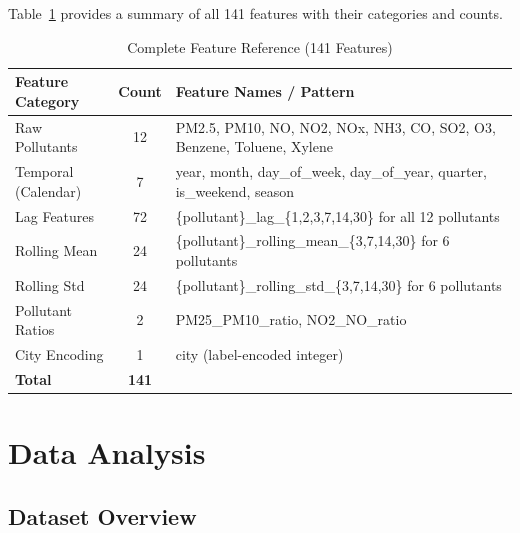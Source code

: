 \documentclass[12pt,a4paper]{report}
\begin{document}
Table~\ref{tab:all_features} provides a summary of all 141 features with their categories and counts.

\begin{table}[H]
\centering
\caption{Complete Feature Reference (141 Features)}
\label{tab:all_features}
\small
\begin{tabular}{|l|c|l|}
\hline
\textbf{Feature Category} & \textbf{Count} & \textbf{Feature Names / Pattern} \\
\hline
Raw Pollutants & 12 & PM2.5, PM10, NO, NO2, NOx, NH3, CO, SO2, O3, Benzene, Toluene, Xylene \\
\hline
Temporal (Calendar) & 7 & year, month, day\_of\_week, day\_of\_year, quarter, is\_weekend, season \\
\hline
Lag Features & 72 & \{pollutant\}\_lag\_\{1,2,3,7,14,30\} for all 12 pollutants \\
\hline
Rolling Mean & 24 & \{pollutant\}\_rolling\_mean\_\{3,7,14,30\} for 6 pollutants \\
\hline
Rolling Std & 24 & \{pollutant\}\_rolling\_std\_\{3,7,14,30\} for 6 pollutants \\
\hline
Pollutant Ratios & 2 & PM25\_PM10\_ratio, NO2\_NO\_ratio \\
\hline
City Encoding & 1 & city (label-encoded integer) \\
\hline
\textbf{Total} & \textbf{141} & \\
\hline
\end{tabular}
\end{table}

\section{Data Analysis}\label{idx:s52}

\subsection{Dataset Overview}
\end{document}
